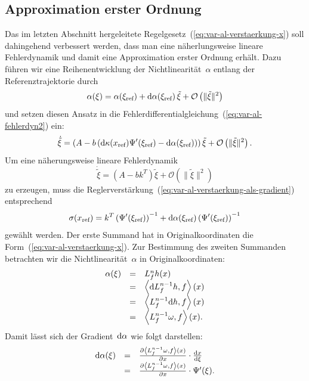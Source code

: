 \subsection{Approximation erster Ordnung\label{subsec:Approx-erster-Ordnung}}

Das im letzten Abschnitt hergeleitete Regelgesetz~(\ref{eq:var-al-verstaerkung-x})
soll dahingehend verbessert werden, dass man eine näherlungsweise
lineare Fehlerdynamik und damit eine Approximation erster Ordnung
erhält. Dazu führen wir eine Reihenentwicklung der Nichtlinearität~$\alpha$
entlang der Referenztrajektorie durch
\[
\alpha(\xi)=\alpha(\xi_{\text{ref}})+{\mathrm{d}}\alpha(\xi_{\text{ref}})\,\tilde{\xi}+\mathcal{O}\left(\|\tilde{\xi}\|^{2}\right)
\]
und setzen diesen Ansatz in die Fehlerdifferentialgleichung~(\ref{eq:var-al-fehlerdyn2})
ein:
\[
\dot{\tilde{\xi}}=\left(A-b\left({\mathrm{d}}\kappa(x_{\text{ref}})\Psi^{\prime}(\xi_{\text{ref}})-{\mathrm{d}}\alpha(\xi_{\text{ref}})\right)\right)\tilde{\xi}+\mathcal{O}\left(\|\tilde{\xi}\|^{2}\right).
\]
Um eine näherungsweise lineare Fehlerdynamik
\begin{equation}
\dot{\tilde{\xi}}=\left(A-bk^{T}\right)\tilde{\xi}+\mathcal{O}\left(\|\tilde{\xi}\|^{2}\right)\label{eq:var-al-fehlerdyn-ordnung-1}
\end{equation}
zu erzeugen, muss die Reglerverstärkung~(\ref{eq:var-al-verstaerkung-als-gradient})
entsprechend
\begin{equation}
\sigma(x_{\text{ref}})=k^{T}\left(\Psi^{\prime}(\xi_{\text{ref}})\right)^{-1}+{\mathrm{d}}\alpha(\xi_{\text{ref}})\left(\Psi^{\prime}(\xi_{\text{ref}})\right)^{-1}\label{eq:var-al-verstaerkung1-z}
\end{equation}
gewählt werden. Der erste Summand hat in Originalkoordinaten die Form~(\ref{eq:var-al-verstaerkung-x}).
Zur Bestimmung des zweiten Summanden betrachten wir die Nichtlinearität~$\alpha$
in Originalkoordinaten:
\[
\begin{array}{ccl}
\alpha(\xi) & = & L_{f}^{n}h(x)\\
 & = & \left\langle {\mathrm{d}} L_{f}^{n-1}h,f\right\rangle (x)\\
 & = & \left\langle L_{f}^{n-1}{\mathrm{d}} h,f\right\rangle (x)\\
 & = & \left\langle L_{f}^{n-1}\omega,f\right\rangle (x).
\end{array}
\]
Damit lässt sich der Gradient~${\mathrm{d}}\alpha$ wie folgt darstellen:
\[
\begin{array}{ccl}
{\mathrm{d}}\alpha(\xi) & = & \frac{\partial\left\langle L_{f}^{n-1}\omega,f\right\rangle (x)}{\partial x}\cdot\frac{{\mathrm{d}} x}{{\mathrm{d}}\xi}\\
 & = & \frac{\partial\left\langle L_{f}^{n-1}\omega,f\right\rangle (x)}{\partial x}\cdot\Psi^{\prime}(\xi).
\end{array}
\]
